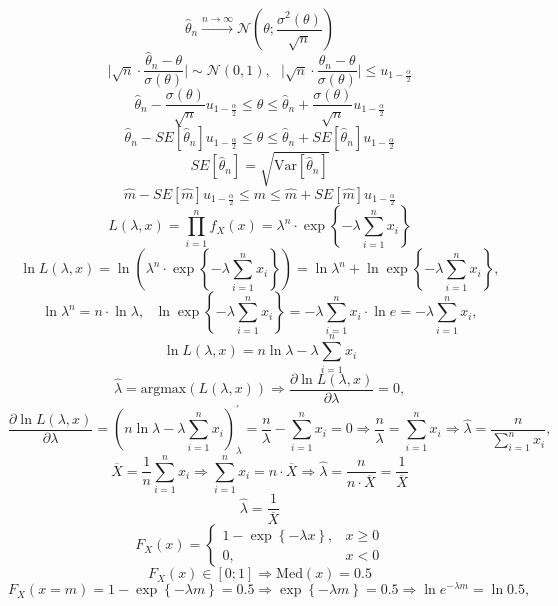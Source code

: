 \documentclass[a4paper, 12pt]{article}
\begin{document}
    $$\hat{\theta}_n\xrightarrow{n\to\infty}\mathcal{N}\left(\theta;\dfrac{\sigma^2\left(\theta\right)}{\sqrt{n}}\right)$$
    $$\Bigg|\sqrt{n}\cdot\dfrac{\hat{\theta}_n-\theta}{\sigma\left(\theta\right)}\Bigg|\sim\mathcal{N}\left(0,1\right),\,\,\,\, \Bigg|\sqrt{n}\cdot\dfrac{\hat{\theta}_n-\theta}{\sigma\left(\theta\right)}\Bigg|\leq u_{1-\frac{\alpha}{2}}$$
    $$\hat{\theta}_n-\dfrac{\sigma\left(\theta\right)}{\sqrt{n}}u_{1-\frac{\alpha}{2}}\leq\theta\leq\hat{\theta}_n+\dfrac{\sigma\left(\theta\right)}{\sqrt{n}}u_{1-\frac{\alpha}{2}}$$
    $$\hat{\theta}_n-SE\left[\hat{\theta}_n\right]u_{1-\frac{\alpha}{2}}\leq\theta\leq\hat{\theta}_n+SE\left[\hat{\theta}_n\right]u_{1-\frac{\alpha}{2}}$$
    $$SE\left[\hat{\theta}_n\right]=\sqrt{\text{Var}\left[\hat{\theta}_n\right]}$$
    $$\hat{m}-SE\left[\hat{m}\right]u_{1-\frac{\alpha}{2}}\leq m\leq\hat{m}+SE\left[\hat{m}\right]u_{1-\frac{\alpha}{2}}$$
    $$L\left(\lambda,x\right)=\prod_{i=1}^{n}f_X\left(x\right)=\lambda^n\cdot\exp{\left\{-\lambda\sum\limits_{i=1}^{n}x_i\right\}}$$
    $$\ln{L\left(\lambda,x\right)}=\ln{\left(\lambda^n\cdot\exp{\left\{-\lambda\sum\limits_{i=1}^{n}x_i\right\}}\right)}=
    \ln{\lambda^n}+\ln{\exp{\left\{-\lambda\sum\limits_{i=1}^{n}x_i\right\}}},$$
    $$\ln{\lambda^n}=n\cdot\ln{\lambda},\,\,\,\,\ln{\exp{\left\{-\lambda\sum\limits_{i=1}^{n}x_i\right\}}}=-\lambda\sum\limits_{i=1}^{n}x_i\cdot\ln{e}=-\lambda\sum\limits_{i=1}^{n}x_i,$$
    $$\ln{L\left(\lambda,x\right)}=n\ln{\lambda}-\lambda\sum\limits_{i=1}^{n}x_i$$
    $$\hat{\lambda}=\text{argmax}\left(L\left(\lambda,x\right)\right)\Rightarrow \dfrac{\partial\ln{L\left(\lambda,x\right)}}{\partial\lambda}=0,$$
    $$\dfrac{\partial\ln{L\left(\lambda,x\right)}}{\partial\lambda}=\left(n\ln{\lambda}-\lambda\sum\limits_{i=1}^{n}x_i\right)_{\lambda}^{\prime}=
    \dfrac{n}{\lambda}-\sum\limits_{i=1}^{n}x_i=0\Rightarrow\dfrac{n}{\lambda}=\sum\limits_{i=1}^{n}x_i\Rightarrow\hat{\lambda}=\dfrac{n}{\sum_{i=1}^{n}x_i},$$
    $$\overline{X}=\dfrac{1}{n}\sum\limits_{i=1}^{n}x_i\Rightarrow\sum\limits_{i=1}^{n}x_i=n\cdot\overline{X}\Rightarrow\hat{\lambda}=\dfrac{n}{n\cdot\overline{X}}=\dfrac{1}{\overline{X}}$$
    $$\hat{\lambda}=\dfrac{1}{\overline{X}}$$
    $$F_X(x)=\begin{cases}
        1-\exp{\left\{-\lambda x\right\}},& x\geq0\\
        0,& x<0
    \end{cases}$$
    $$F_X(x)\in\left[0;1\right]\Rightarrow\text{Med}\left(x\right)=0.5$$
    $$F_X(x=m)=1-\exp{\left\{-\lambda m\right\}}=0.5\Rightarrow\exp{\left\{-\lambda m\right\}}=0.5\Rightarrow\ln{e^{-\lambda m}}=\ln{0.5},$$
\end{document}

